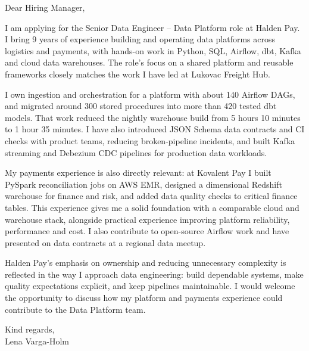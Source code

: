 \documentclass[11pt,a4paper]{article}
\begin{document}
Dear Hiring Manager,

I am applying for the Senior Data Engineer -- Data Platform role at Halden Pay. I bring 9 years of experience building and operating data platforms across logistics and payments, with hands-on work in Python, SQL, Airflow, dbt, Kafka and cloud data warehouses. The role’s focus on a shared platform and reusable frameworks closely matches the work I have led at Lukovac Freight Hub.

I own ingestion and orchestration for a platform with about 140 Airflow DAGs, and migrated around 300 stored procedures into more than 420 tested dbt models. That work reduced the nightly warehouse build from 5 hours 10 minutes to 1 hour 35 minutes. I have also introduced JSON Schema data contracts and CI checks with product teams, reducing broken-pipeline incidents, and built Kafka streaming and Debezium CDC pipelines for production data workloads.

My payments experience is also directly relevant: at Kovalent Pay I built PySpark reconciliation jobs on AWS EMR, designed a dimensional Redshift warehouse for finance and risk, and added data quality checks to critical finance tables. This experience gives me a solid foundation with a comparable cloud and warehouse stack, alongside practical experience improving platform reliability, performance and cost. I also contribute to open-source Airflow work and have presented on data contracts at a regional data meetup.

Halden Pay’s emphasis on ownership and reducing unnecessary complexity is reflected in the way I approach data engineering: build dependable systems, make quality expectations explicit, and keep pipelines maintainable. I would welcome the opportunity to discuss how my platform and payments experience could contribute to the Data Platform team.

Kind regards,\\
Lena Varga-Holm
\end{document}
